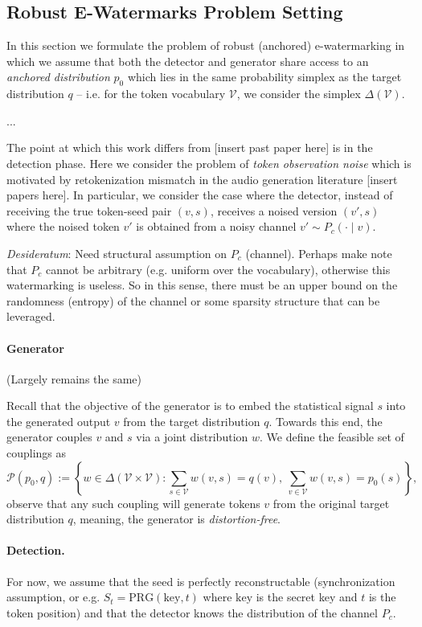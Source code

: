 \documentclass[12pt]{article}
\theoremstyle{plain}
\theoremstyle{definition}
\begin{document}
\subsection{Robust E-Watermarks Problem Setting}
In this section we formulate the problem of robust (anchored) e-watermarking in which we assume that both the detector and generator share access to an \textit{anchored distribution} $p_0$ which lies in the same probability simplex as the target distribution $q$ -- i.e. for the token vocabulary $\mathcal{V}$, we consider the simplex $\Delta(\mathcal{V})$.

...

The point at which this work differs from [insert past paper here] is in the detection phase. Here we consider the problem of \textit{token observation noise} which is motivated by retokenization mismatch in the audio generation literature [insert papers here]. In particular, we consider the case where the detector, instead of receiving the true token-seed pair $(v,s)$, receives a noised version $(v', s)$ where the noised token $v'$ is obtained from a noisy channel $v' \sim P_{c}(\cdot\mid v)$. 

\textit{Desideratum}: Need structural assumption on $P_c$ (channel). Perhaps make note that $P_c$ cannot be arbitrary (e.g. uniform over the vocabulary), otherwise this watermarking is useless. So in this sense, there must be an upper bound on the randomness (entropy) of the channel or some sparsity structure that can be leveraged. 

\paragraph{Generator} (Largely remains the same)

Recall that the objective of the generator is to embed the statistical signal $s$ into the generated output $v$ from the target distribution $q$. Towards this end, the generator couples $v$ and $s$ via a joint distribution $w$. We define the feasible set of couplings as 
\begin{equation}\label{eq:feascouplings}
    \mathcal{P}(p_0,q) := \left\{w \in \Delta(\mathcal{V} \times \mathcal{V}): \sum_{s \in \mathcal{V}}w(v,s) = q(v), ~ \sum_{v \in \mathcal{V}}w(v,s) = p_0(s)\right\},
\end{equation}
observe that any such coupling will generate tokens $v$ from the original target distribution $q$, meaning, the generator is \textit{distortion-free}.

\paragraph{Detection.}
For now, we assume that the seed is perfectly reconstructable (synchronization assumption, or e.g. $S_t = \text{PRG}(\text{key}, t)$ where $\text{key}$ is the secret key and $t$ is the token position) and that the detector knows the distribution of the channel $P_c$. 
\end{document}
